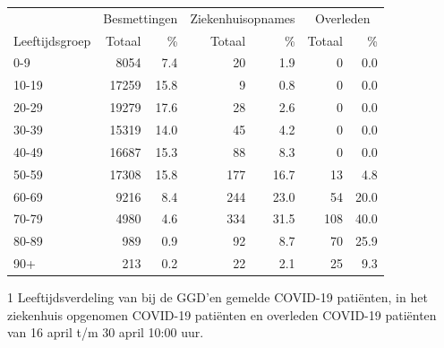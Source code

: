 \documentclass[
  english,
  man,floatsintext]{apa6}
\begin{document}
\begin{table}
\centering\begingroup\fontsize{11}{13}\selectfont

\begin{threeparttable}
\begin{tabular}{lrrrrrr}
\toprule
\multicolumn{1}{c}{ } & \multicolumn{2}{c}{Besmettingen} & \multicolumn{2}{c}{Ziekenhuisopnames} & \multicolumn{2}{c}{Overleden} \\
\cmidrule(l{3pt}r{3pt}){2-3} \cmidrule(l{3pt}r{3pt}){4-5} \cmidrule(l{3pt}r{3pt}){6-7}
Leeftijdsgroep & Totaal & \% & Totaal & \% & Totaal & \%\\
\midrule
0-9 & 8054 & 7.4 & 20 & 1.9 & 0 & 0.0\\
10-19 & 17259 & 15.8 & 9 & 0.8 & 0 & 0.0\\
20-29 & 19279 & 17.6 & 28 & 2.6 & 0 & 0.0\\
30-39 & 15319 & 14.0 & 45 & 4.2 & 0 & 0.0\\
40-49 & 16687 & 15.3 & 88 & 8.3 & 0 & 0.0\\
50-59 & 17308 & 15.8 & 177 & 16.7 & 13 & 4.8\\
60-69 & 9216 & 8.4 & 244 & 23.0 & 54 & 20.0\\
70-79 & 4980 & 4.6 & 334 & 31.5 & 108 & 40.0\\
80-89 & 989 & 0.9 & 92 & 8.7 & 70 & 25.9\\
90+ & 213 & 0.2 & 22 & 2.1 & 25 & 9.3\\
\bottomrule
\end{tabular}
\begin{tablenotes}
\item[1] Leeftijdsverdeling van bij de GGD’en gemelde COVID-19 patiënten, in het ziekenhuis opgenomen COVID-19 patiënten en overleden COVID-19 patiënten van 16 april t/m 30 april 10:00 uur.
\end{tablenotes}
\end{threeparttable}
\endgroup{}
\end{table}

\newpage
\end{document}
